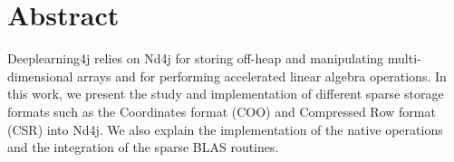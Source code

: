 

\cleardoublepage
\chapter*{Abstract}

Deeplearning4j relies on Nd4j for storing off-heap and manipulating multi-dimensional arrays and for performing accelerated linear algebra operations. In this work, we present the study and implementation of different sparse storage formats such as the Coordinates format (COO) and Compressed Row format (CSR) into Nd4j. We also explain the implementation of the native operations and the integration of the sparse BLAS routines.



\vskip0.5cm




